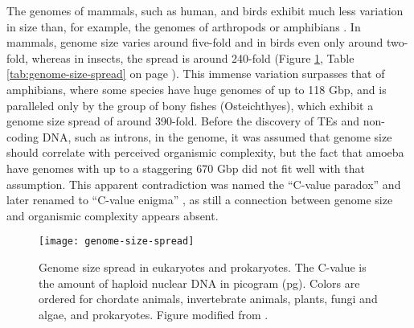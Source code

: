The genomes of mammals, such as human, and birds exhibit much less
variation in size than, for example, the genomes of arthropods or 
amphibians \citep{Gregory2005}. In mammals, genome size varies around
five-fold and in birds even only around two-fold, whereas in insects,
the spread is around 240-fold (Figure \ref{fig:genome-size-spread}, Table
\ref{tab:genome-size-spread} on page \pageref{tab:genome-size-spread}). This
immense variation surpasses that of amphibians, where some species have huge
genomes of up to 118 Gbp, and is paralleled only by the group of bony fishes
(Osteichthyes), which exhibit a genome size spread of around 390-fold. Before
the discovery of TEs and non-coding DNA, such as introns, in the genome, it was
assumed that genome size should correlate with perceived organismic complexity,
but the fact that amoeba have genomes with up to a staggering 670 Gbp
\citep{Parfrey2008} did not fit well with that assumption. This apparent
contradiction was named the ``C-value paradox'' and later renamed to ``C-value
enigma'' \citep{Gregory2007}, as still a connection between genome size and
organismic complexity appears absent.

\begin{figure}
\centering
\texttt{[image: genome-size-spread]}
\caption[Genome size spread in eukaryotes and prokaryotes]{Genome size spread
in eukaryotes and prokaryotes. The C-value is the amount of haploid nuclear DNA
in picogram (pg). Colors are ordered for chordate animals, invertebrate
animals, plants, fungi and algae, and prokaryotes. Figure modified from
\citet{Gregory2004}.}
\label{fig:genome-size-spread}
\end{figure}

